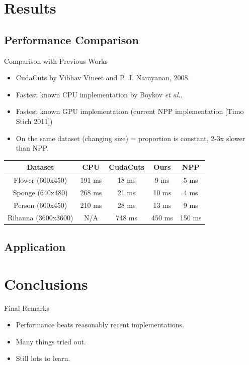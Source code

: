 \documentclass{beamer}
\begin{document}
\section{Results}

\subsection{Performance Comparison}

\begin{frame}{Comparison with Previous Works}
\begin{itemize}
\item
CudaCuts by Vibhav Vineet and P. J. Narayanan, 2008.
\item
Fastest known CPU implementation by Boykov \emph{et al.}.
\item
Fastest known GPU implementation (current NPP implementation [Timo Stich 2011])
\item
On the same dataset (changing size) = proportion is constant, 2-3x slower than NPP.
\end{itemize}

 \begin{tabular}{|c|c|c|c|c|}
\hline
\textbf{Dataset}   &  \textbf{CPU}    & \textbf{CudaCuts} & \textbf{Ours}    & \textbf{NPP} \\
\hline
Flower (600x450)   &  191 ms & 18 ms    & 9 ms    & 5 ms   \\
Sponge (640x480)   &  268 ms & 21 ms    & 10 ms   & 4 ms   \\
Person (600x450)   &  210 ms & 28 ms    & 13 ms   & 9 ms   \\
Rihanna (3600x3600)&  N/A    & 748 ms   & 450 ms  & 150 ms \\
\hline
\end{tabular}
\end{frame}


\subsection{Application}


\section{Conclusions}

\begin{frame}{Final Remarks}
\begin{itemize}
 \item
 Performance beats reasonably recent implementations.
 \item
 Many things tried out.
 \item
 Still lots to learn.
\end{itemize}
\end{frame}
\end{document}
